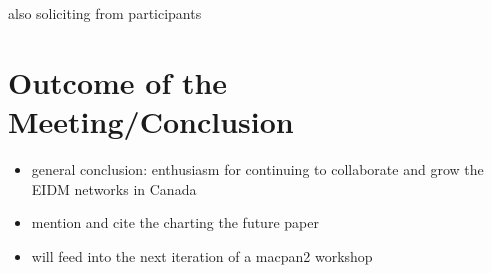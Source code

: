 also soliciting from participants

\section{Outcome of the Meeting/Conclusion}

\begin{itemize}
    \item general conclusion: enthusiasm for continuing to collaborate and grow the EIDM networks in Canada
    \item mention and cite the charting the future paper
    \item will feed into the next iteration of a macpan2 workshop
\end{itemize}

\begin{thebibliography}{}





\end{thebibliography}



